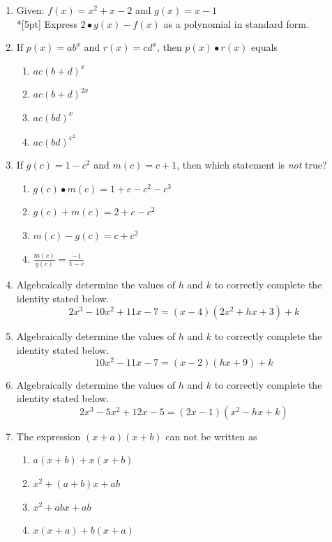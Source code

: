 \documentclass[12pt, oneside]{article}
\begin{document}
\begin{enumerate}
\item Given: $f(x)=x^2+ x - 2$ and $g(x)=x-1$\\*[5pt]
Express $2 \bullet g(x) - f(x)$ as a polynomial in standard form. %

\item If $p(x)=ab^x$ and $r(x)=cd^x$, then $p(x) \bullet r(x)$ equals
\begin{enumerate}
    \item $ac(b+d)^x$
    \item $ac(b+d)^{2x}$
    \item $ac(bd)^x$
    \item $\displaystyle ac(bd)^{x^2}$
\end{enumerate} %


\item If $g(c)=1-c^2$ and $m(c)=c+1$, then which statement is \emph{not} true?
\begin{enumerate}
    \item $g(c) \bullet m(c) = 1+c-c^2-c^3$
    \item $g(c) + m(c) = 2+c-c^2$
    \item $m(c) - g(c) = c+c^2$
    \item $\displaystyle \frac{m(c)}{g(c)} = \frac{-1}{1-c}$
\end{enumerate} %


\item Algebraically determine the values of $h$ and $k$ to correctly complete the identity stated below.
\[2x^3-10x^2+11x-7=(x-4)(2x^2+hx+3)+k\] %

\item Algebraically determine the values of $h$ and $k$ to correctly complete the identity stated below.
\[10x^2-11x-7=(x-2)(hx+9)+k\]

\item Algebraically determine the values of $h$ and $k$ to correctly complete the identity stated below.
\[2x^3-5x^2+12x-5=(2x-1)(x^2-hx+k)\]

\item The expression $(x + a)(x + b)$ can not be written as
\begin{enumerate}
    \item $a(x + b)+ x(x + b)$
    \item $x^2 + (a + b)x + ab$ 
    \item  $x^2 + abx + ab$  
    \item $x(x + a)+ b(x + a)$
\end{enumerate}


\end{enumerate}
\end{document}
